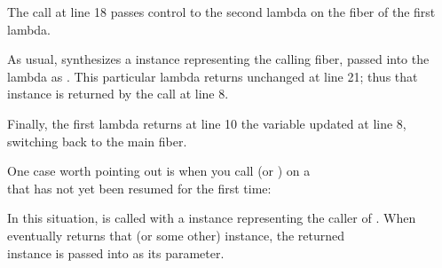 
The  call at line 18 passes control to the second
lambda on the fiber of the first lambda.

As usual, \resumewith synthesizes a \fiber instance representing the calling
fiber, passed into the lambda as . This particular lambda returns 
unchanged at line 21; thus that  instance is returned by the \resume call
at line 8.

Finally, the first lambda returns at line 10 the  variable updated at
line 8, switching back to the main fiber.

One case worth pointing out is when you call \resumewith (or \xtresumewith) on
a\\
\fiber that has not yet been resumed for the first time:

In this situation,  is called with a \fiber instance
representing the caller of \resumewith. When  eventually
returns that (or some other) \fiber instance, the returned\\
\fiber instance is passed into  as its  parameter.


